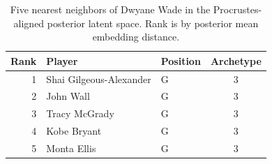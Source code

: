 \begin{table}[htbp]
  \centering\small
  \begin{tabular}{rllc}
    \toprule
    Rank & Player & Position & Archetype \\
    \midrule
    1 & Shai Gilgeous-Alexander & G & 3 \\
    2 & John Wall & G & 3 \\
    3 & Tracy McGrady & G & 3 \\
    4 & Kobe Bryant & G & 3 \\
    5 & Monta Ellis & G & 3 \\
    \bottomrule
  \end{tabular}
  \caption{Five nearest neighbors of Dwyane Wade in the Procrustes-aligned posterior latent space. Rank is by posterior mean embedding distance.}
  \label{tab:Dwyane_Wade_neighbors}
\end{table}

